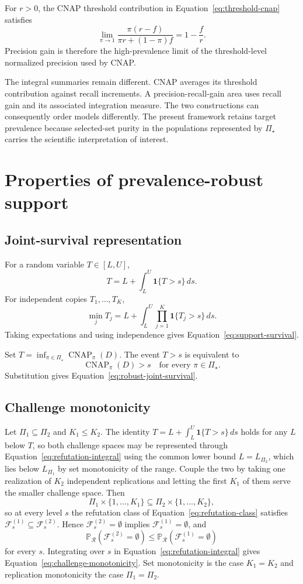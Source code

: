 \documentclass[11pt]{article}
\newcommand{\CNAP}{\operatorname{CNAP}}
\newcommand{\Regime}{\mathcal{R}}
\newcommand{\PSet}{\Pi_\star}
\newcommand{\Prb}{\mathbb{P}}
\newcommand{\RefSet}{\mathcal{F}}
\theoremstyle{remark}
\begin{document}
For $r>0$, the CNAP threshold contribution in Equation~\eqref{eq:threshold-cnap} satisfies
\begin{equation}
\lim_{\pi\to1}
\frac{\pi(r-f)}
{\pi r+(1-\pi)f}
=
1-\frac{f}{r}.
\label{eq:precision-gain-limit}
\end{equation}
Precision gain is therefore the high-prevalence limit of the threshold-level normalized precision used by CNAP.

The integral summaries remain different. CNAP averages its threshold contribution against recall increments. A precision-recall-gain area uses recall gain and its associated integration measure. The two constructions can consequently order models differently. The present framework retains target prevalence because selected-set purity in the populations represented by $\PSet$ carries the scientific interpretation of interest.

\section{Properties of prevalence-robust support}
\label{app:proofs}

\subsection{Joint-survival representation}

For a random variable $T\in[L,U]$,
\[
T
=
L+\int_L^U\mathbf{1}\{T>s\}\,ds.
\]
For independent copies $T_1,\ldots,T_K$,
\[
\min_jT_j
=
L+
\int_L^U
\prod_{j=1}^{K}
\mathbf{1}\{T_j>s\}\,ds.
\]
Taking expectations and using independence gives Equation~\eqref{eq:support-survival}.

Set $T=\inf_{\pi\in\PSet}\CNAP_\pi(D)$. The event $T>s$ is equivalent to
\[
\CNAP_\pi(D)>s
\quad
\text{for every }\pi\in\PSet.
\]
Substitution gives Equation~\eqref{eq:robust-joint-survival}.

\subsection{Challenge monotonicity}

Let $\Pi_1\subseteq\Pi_2$ and $K_1\leq K_2$. The identity $T=L+\int_L^U\mathbf{1}\{T>s\}\,ds$ holds for any $L$ below $T$, so both challenge spaces may be represented through Equation~\eqref{eq:refutation-integral} using the common lower bound $L=L_{\Pi_2}$, which lies below $L_{\Pi_1}$ by set monotonicity of the range. Couple the two by taking one realization of $K_2$ independent replications and letting the first $K_1$ of them serve the smaller challenge space. Then
\[
\Pi_1\times\{1,\ldots,K_1\}
\subseteq
\Pi_2\times\{1,\ldots,K_2\},
\]
so at every level $s$ the refutation class of Equation~\eqref{eq:refutation-class} satisfies $\RefSet_s^{(1)}\subseteq\RefSet_s^{(2)}$. Hence $\RefSet_s^{(2)}=\emptyset$ implies $\RefSet_s^{(1)}=\emptyset$, and
\[
\Prb_{\Regime}\left(\RefSet_s^{(2)}=\emptyset\right)
\leq
\Prb_{\Regime}\left(\RefSet_s^{(1)}=\emptyset\right)
\]
for every $s$. Integrating over $s$ in Equation~\eqref{eq:refutation-integral} gives Equation~\eqref{eq:challenge-monotonicity}. Set monotonicity is the case $K_1=K_2$ and replication monotonicity the case $\Pi_1=\Pi_2$.
\end{document}
